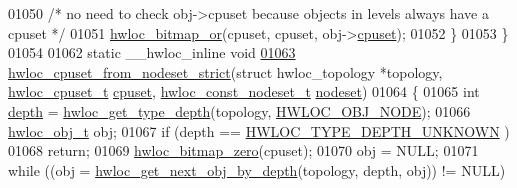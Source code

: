 \begin{DoxyCode}
01050                         \textcolor{comment}{/* no need to check obj->cpuset because objects in levels
       always have a cpuset */}
01051                         \hyperlink{a00065_ga1ba1de709ee9a7cf5cc8ad2d9a1a81d4}{hwloc_bitmap_or}(cpuset, cpuset, obj->\hyperlink{a00016_a67925e0f2c47f50408fbdb9bddd0790f}{cpuset});
01052         \}
01053 \}
01054 
01062 \textcolor{keyword}{static} \_\_hwloc\_inline \textcolor{keywordtype}{void}
\hypertarget{a00031_source_l01063}{}\hyperlink{a00062_gaa7c3f39802b00a758c58e024a8119979}{01063} \hyperlink{a00062_gaa7c3f39802b00a758c58e024a8119979}{hwloc_cpuset_from_nodeset_strict}(\textcolor{keyword}{struct} hwloc\_topology *topology, \hyperlink{a00040_ga4bbf39b68b6f568fb92739e7c0ea7801}{hwloc_cpuset_t} 
      \hyperlink{a00016_a67925e0f2c47f50408fbdb9bddd0790f}{cpuset}, \hyperlink{a00040_ga2f5276235841ad66a79bedad16a5a10c}{hwloc_const_nodeset_t} \hyperlink{a00016_a08f0d0e16c619a6e653526cbee4ffea3}{nodeset})
01064 \{
01065         \textcolor{keywordtype}{int} \hyperlink{a00016_a9d82690370275d42d652eccdea5d3ee5}{depth} = \hyperlink{a00046_gaea7c64dd59467f5201ba87712710b14d}{hwloc_get_type_depth}(topology, \hyperlink{a00041_ggacd37bb612667dc437d66bfb175a8dc55aaf0964881117bdedf1a5e9332cd120dd}{HWLOC_OBJ_NODE});
01066         \hyperlink{a00016}{hwloc_obj_t} obj;
01067         \textcolor{keywordflow}{if} (depth == \hyperlink{a00046_ggaf4e663cf42bbe20756b849c6293ef575a0565ab92ab72cb0cec91e23003294aad}{HWLOC_TYPE_DEPTH_UNKNOWN} )
01068                 \textcolor{keywordflow}{return};
01069         \hyperlink{a00065_ga6c540b9fe63b8223b6aba46d56dd63b8}{hwloc_bitmap_zero}(cpuset);
01070         obj = NULL;
01071         \textcolor{keywordflow}{while} ((obj = \hyperlink{a00053_gab7c1dce3f42ece5bfa621e87cf332418}{hwloc_get_next_obj_by_depth}(topology, depth, obj)) != NULL)
      

\end{DoxyCode}

